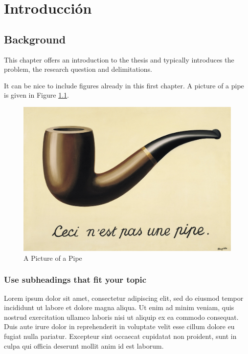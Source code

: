 \documentclass[11pt]{report}
\begin{document}
\listoffigures
\thispagestyle{plain}

\listoftables
\thispagestyle{plain}


\chapter{Introducción}
\setcounter{page}{1}


\section{Background}

This chapter offers an introduction to the thesis and typically introduces the problem, the research question and delimitations.

It can be nice to include figures already in this first chapter. A picture of a pipe is given in Figure \ref{fig:pipe}.

\begin{figure} [h]
\centering
\includegraphics[scale = 0.6]{img/pipe.jpg}
\caption{A Picture of a Pipe}
 \label{fig:pipe}
\end{figure}


\subsection{Use subheadings that fit your topic}
Lorem ipsum dolor sit amet, consectetur adipiscing elit, sed do eiusmod tempor incididunt ut labore et dolore magna aliqua. Ut enim ad minim veniam, quis nostrud exercitation ullamco laboris nisi ut aliquip ex ea commodo consequat. Duis aute irure dolor in reprehenderit in voluptate velit esse cillum dolore eu fugiat nulla pariatur. Excepteur sint occaecat cupidatat non proident, sunt in culpa qui officia deserunt mollit anim id est laborum.
\end{document}

